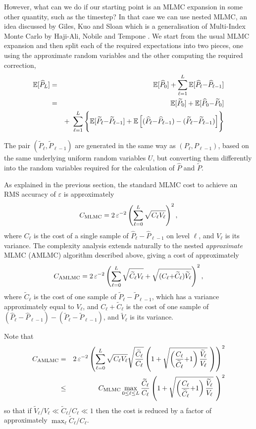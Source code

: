 \documentclass[review]{siamart190516}
\def \EE {{\mathbb{E}}}
\def \tP {{\widetilde{P}}}
\def \tC {{\widetilde{C}}}
\def \tV {{\widetilde{V}}}
\def \hP {{\widehat{P}}}
\def\eps{{\varepsilon}}
\begin{document}
However, what can we do if our starting point is an MLMC expansion in some 
other quantity, such as the timestep?  In that case we can use nested MLMC,
an idea discussed by Giles, Kuo and Sloan \cite{gks18} which is a generalisation of 
Multi-Index Monte Carlo by Haji-Ali, Nobile and Tempone \cite{hnt16}.
We start from the usual MLMC expansion and then split each of the required
expectations into two pieces, one using the approximate random variables and the
other computing the required correction,
\begin{eqnarray*}
\EE[ \hP_L ] &=& \EE[ \hP_0 ] + \sum_{\ell=1}^L \EE[ \hP_\ell {-} \hP_{\ell-1} ]\\
           &=& \EE[ \tP_0 ] + \EE[ \hP_0 {-}\tP_0 ] \\
& & +\ \sum_{\ell=1}^L \left\{\rule{0in}{0.22in}  \EE[ \tP_\ell {-} \tP_{\ell-1} ] + 
\EE\left[ (\hP_\ell {-} \hP_{\ell-1}) - (\tP_\ell {-} \tP_{\ell-1}) \right] \right\}
\end{eqnarray*}

The pair $(\tP_\ell, \tP_{\ell-1})$ are generated in the same way as
$(P_\ell, P_{\ell-1})$, based on the same underlying uniform random variables $U$,
but converting them differently into the random variables required for the
calculation of $\hP$ and $\tP$.


As explained in the previous section, the standard
MLMC cost to achieve an RMS accuracy of $\eps$ is approximately
\[
C_{\rm MLMC} = 2\, \eps^{-2} \left( \sum_{\ell=0}^L \sqrt{C_\ell V_\ell} \right)^2,
\]
where $C_\ell$ is the cost of a single sample of $\hP_\ell{-}\hP_{\ell-1}$
on level $\ell$, and $V_\ell$ is its variance.
The complexity analysis extends naturally to the nested
{\em approximate} MLMC (AMLMC)
algorithm described above, giving a cost of approximately
\[
C_{\rm AMLMC} = 2\, \eps^{-2} \left( \sum_{\ell=0}^L \sqrt{\tC_\ell V_\ell}
    + \sqrt{(C_\ell{+}\tC_\ell) \tV_\ell} \right)^2,
\]
where $\tC_\ell$ is the cost of one sample of $\tP_\ell{-}\tP_{\ell-1}$,
which has a variance approximately equal to $V_\ell$, and
$C_\ell{+}\tC_\ell$ is the cost of one sample of 
$(\hP_\ell{-}\hP_{\ell-1}) - (\tP_\ell{-}\tP_{\ell-1})$, and $\tV_\ell$ is
its variance.

Note that 
\begin{eqnarray*}
  C_{\rm AMLMC} &=& 2\, \eps^{-2} \left( \sum_{\ell=0}^L \sqrt{C_\ell V_\ell}
  \sqrt{\frac{\tC_\ell}{C_\ell}} \left( 1 
  + \sqrt{\left(\frac{C_\ell}{\tC_\ell}{+}1\right) \frac{\tV_\ell}{V_\ell}}\ \right)
   \right)^2\\
  &\leq & C_{\rm MLMC} \max_{0\leq\ell\leq L} \frac{\tC_\ell}{C_\ell}
  \left( 1+ \sqrt{\left(\frac{C_\ell}{\tC_\ell}{+}1\right) \frac{\tV_\ell}{V_\ell}}\ \right)^2
\end{eqnarray*}
so that if $\displaystyle \tV_\ell/V_\ell \ll \tC_\ell/C_\ell \ll 1$
then the cost is reduced by a factor of approximately
$\max_\ell  \tC_\ell/C_\ell$.
\end{document}

